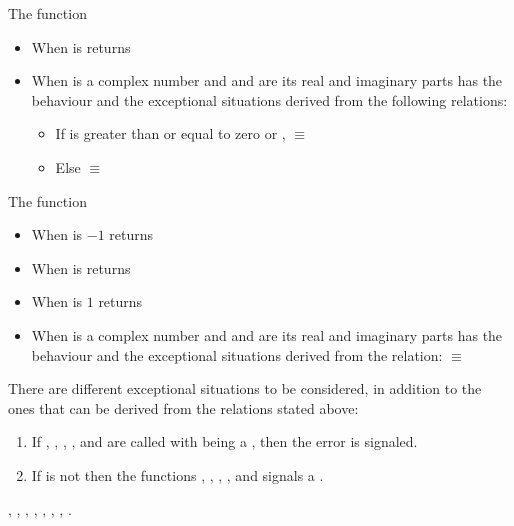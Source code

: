 \documentclass[../Exponentials-Logarithms-Trigonometry.tex]{subfiles}
\begin{document}
\noindent
The function 
\begin{itemize}
  \item When  is  returns
  \item When  is a complex number and   and 
  are its real and imaginary parts has the behaviour and the exceptional
  situations derived from the following relations:
  \begin{itemize}
    \item If  is greater than or equal to zero or
    , \code{)}
    $\equiv$ \code{
    }\code{)))}
    \item Else  \code{)}
    $\equiv$ \code{
    }\code{))))}
  \end{itemize}
\end{itemize}

\noindent
The function 
\begin{itemize}
  \item When  is $-1$ returns 
  \item When  is  returns 
  \item When  is $1$ returns 
  \item When  is a complex number and   and 
  are its real and imaginary parts has the behaviour and the exceptional
  situations derived from the relation: \code{)}
  $\equiv$ \code{ (-
  }\code{)))}
\end{itemize}

\DExceptional{}

There are different exceptional situations to be considered, in addition to
the ones that can be derived from the relations stated above:
\begin{enumerate}
  \item If , , , ,
     and  are called with
     being a , then the
     error is signaled.
  \item If  is not \CL{}
     then the functions , , ,
    ,  and  signals a
    .
\end{enumerate}

\DSeeAlso{}

\code{*}, \code{-}, , , , ,
, .
\end{document}

